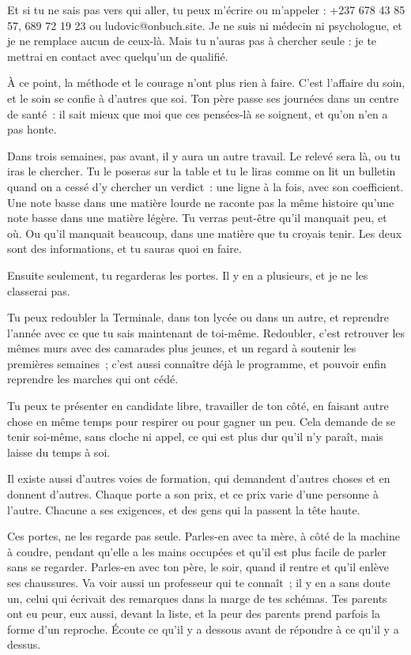 \documentclass[10.5pt,twoside,openright]{book}
\begin{document}
Et si tu ne sais pas vers qui aller, tu peux m’écrire ou m’appeler : +237 678 43 85 57, 689 72 19 23 ou ludovic@onbuch.site. Je ne suis ni médecin ni psychologue, et je ne remplace aucun de ceux-là. Mais tu n’auras pas à chercher seule : je te mettrai en contact avec quelqu’un de qualifié.

À ce point, la méthode et le courage n’ont plus rien à faire. C’est l’affaire du soin, et le soin se confie à d’autres que soi. Ton père passe ses journées dans un centre de santé : il sait mieux que moi que ces pensées-là se soignent, et qu’on n’en a pas honte.

Dans trois semaines, pas avant, il y aura un autre travail. Le relevé sera là, ou tu iras le chercher. Tu le poseras sur la table et tu le liras comme on lit un bulletin quand on a cessé d’y chercher un verdict : une ligne à la fois, avec son coefficient. Une note basse dans une matière lourde ne raconte pas la même histoire qu’une note basse dans une matière légère. Tu verras peut-être qu’il manquait peu, et où. Ou qu’il manquait beaucoup, dans une matière que tu croyais tenir. Les deux sont des informations, et tu sauras quoi en faire.

Ensuite seulement, tu regarderas les portes. Il y en a plusieurs, et je ne les classerai pas.

Tu peux redoubler la Terminale, dans ton lycée ou dans un autre, et reprendre l’année avec ce que tu sais maintenant de toi-même. Redoubler, c’est retrouver les mêmes murs avec des camarades plus jeunes, et un regard à soutenir les premières semaines ; c’est aussi connaître déjà le programme, et pouvoir enfin reprendre les marches qui ont cédé.

Tu peux te présenter en candidate libre, travailler de ton côté, en faisant autre chose en même temps pour respirer ou pour gagner un peu. Cela demande de se tenir soi-même, sans cloche ni appel, ce qui est plus dur qu’il n’y paraît, mais laisse du temps à soi.

Il existe aussi d’autres voies de formation, qui demandent d’autres choses et en donnent d’autres. Chaque porte a son prix, et ce prix varie d’une personne à l’autre. Chacune a ses exigences, et des gens qui la passent la tête haute.

Ces portes, ne les regarde pas seule. Parles-en avec ta mère, à côté de la machine à coudre, pendant qu’elle a les mains occupées et qu’il est plus facile de parler sans se regarder. Parles-en avec ton père, le soir, quand il rentre et qu’il enlève ses chaussures. Va voir aussi un professeur qui te connaît ; il y en a sans doute un, celui qui écrivait des remarques dans la marge de tes schémas. Tes parents ont eu peur, eux aussi, devant la liste, et la peur des parents prend parfois la forme d’un reproche. Écoute ce qu’il y a dessous avant de répondre à ce qu’il y a dessus.
\end{document}

